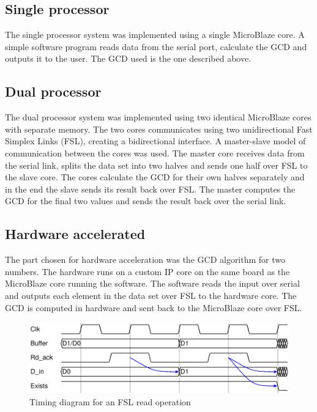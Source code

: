 \documentclass[11pt]{article}
\begin{document}
\subsection{Single processor}
The single processor system was implemented using a single MicroBlaze core. A simple software program reads data from the serial port, calculate the GCD and outputs it to the user. The GCD used is the one described above.

\subsection{Dual processor}
The dual processor system was implemented using two identical MicroBlaze cores with separate memory. The two cores communicates using two unidirectional Fast Simplex Links (FSL), creating a bidirectional interface. A master-slave model of communication between the cores was used. The master core receives data from the serial link, splits the data set into two halves and sends one half over FSL to the slave core. The cores calculate the GCD for their own halves separately and in the end the slave sends its result back over FSL. The master computes the GCD for the final two values and sends the result back over the serial link.

\subsection{Hardware accelerated}
The part chosen for hardware acceleration was the GCD algorithm for two numbers. The hardware runs on a custom IP core on the same board as the MicroBlaze core running the software. The software reads the input over serial and outputs each element in the data set over FSL to the hardware core. The GCD is computed in hardware and sent back to the MicroBlaze core over FSL.

\begin{figure}
  \centering
  \includegraphics[width=1\textwidth]{timingdiagrams/read.pdf}
  \caption{Timing diagram for an FSL read operation}
  \label{fig:fsl-read}
\end{figure}
\end{document}
